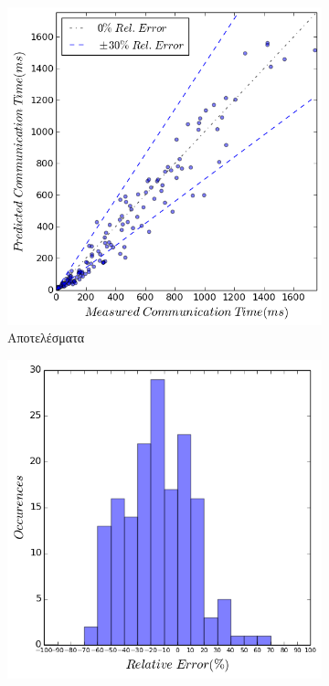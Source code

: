 \begin{figure}[ht]
    \centering
    \captionsetup{justification=centering,margin=0cm,font=footnotesize}
    \begin{subfigure}[b]{0.47\textwidth}
        \includegraphics[width=\textwidth]{./images/NB+cg_NUMA/NB_cg_jacobi_res.png}
        \caption{Αποτελέσματα}
    \end{subfigure}
    \quad %
    \begin{subfigure}[b]{0.47\textwidth}
        \includegraphics[width=\textwidth]{./images/NB+cg_NUMA/NB_cg_jacobi_err_dist.png}

\end{subfigure}
\end{figure}
